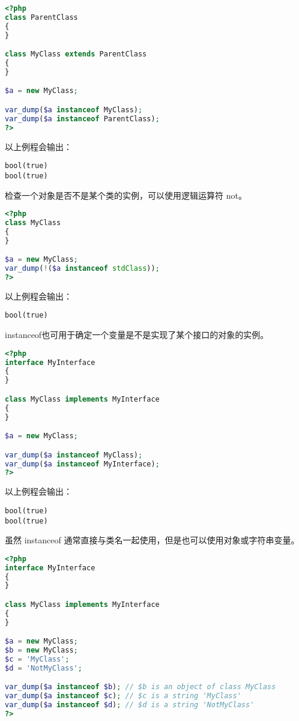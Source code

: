 \begin{lstlisting}[language=PHP]
<?php
class ParentClass
{
}

class MyClass extends ParentClass
{
}

$a = new MyClass;

var_dump($a instanceof MyClass);
var_dump($a instanceof ParentClass);
?>
\end{lstlisting}

以上例程会输出：

\begin{verbatim}
bool(true)
bool(true)
\end{verbatim}

检查一个对象是否不是某个类的实例，可以使用逻辑运算符 not。


\begin{lstlisting}[language=PHP]
<?php
class MyClass
{
}

$a = new MyClass;
var_dump(!($a instanceof stdClass));
?>
\end{lstlisting}

以上例程会输出：

\begin{verbatim}
bool(true)
\end{verbatim}

instanceof也可用于确定一个变量是不是实现了某个接口的对象的实例。

\begin{lstlisting}[language=PHP]
<?php
interface MyInterface
{
}

class MyClass implements MyInterface
{
}

$a = new MyClass;

var_dump($a instanceof MyClass);
var_dump($a instanceof MyInterface);
?>
\end{lstlisting}

以上例程会输出：

\begin{verbatim}
bool(true)
bool(true)
\end{verbatim}

虽然 instanceof 通常直接与类名一起使用，但是也可以使用对象或字符串变量。

\begin{lstlisting}[language=PHP]
<?php
interface MyInterface
{
}

class MyClass implements MyInterface
{
}

$a = new MyClass;
$b = new MyClass;
$c = 'MyClass';
$d = 'NotMyClass';

var_dump($a instanceof $b); // $b is an object of class MyClass
var_dump($a instanceof $c); // $c is a string 'MyClass'
var_dump($a instanceof $d); // $d is a string 'NotMyClass'
?>
\end{lstlisting}

